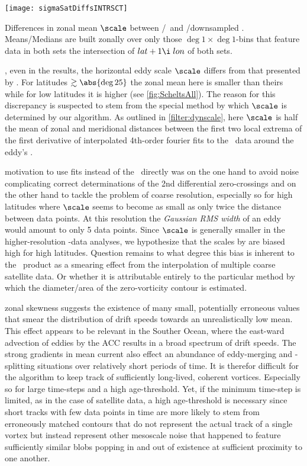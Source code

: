 \begin{marginfigure}
	\texttt{[image: sigmaSatDiffsINTRSCT]}
	\caption{Differences in zonal mean $\scale$ between \AVI/\POP~and \AVI/downsampled \POP. Means/Medians are built zonally over only those $\deg{1}\times\deg{1}$-bins that feature data in both sets \ie the intersection of $lat+1\i \; lon$ of both sets. }
	\label{fig:sigmaSatDiffsINTRSCT}
\end{marginfigure}

, even in the \aviI results, the horizontal eddy scale $\scale$ differs from that presented by \citet{Chelton2011}. For latitudes $\gtrsim\abs{\deg{25}}$ the zonal mean here is smaller than theirs while for low latitudes it is higher (see \cref{fig:ScheltsAll}). The reason for this discrepancy is suspected to stem from the special method by which $\scale$ is determined by our algorithm.
As outlined in \cref{filter:dynscale}, here $\scale$ is half the mean of zonal and meridional distances between the first two local extrema of the first derivative of interpolated 4th-order fourier fits to the \SSH~data around the eddy's \CoV.

 motivation to use fits instead of the \SSH~directly was on the one hand to avoid noise complicating correct determinations of the 2nd differential zero-crossings and on the other hand to tackle the problem of coarse resolution, especially so for high latitudes where $\scale$ seems to become as small as only twice the distance between data points. At this resolution the \textit{Gaussian RMS width} of an eddy would amount to only 5 data points. Since $\scale$ is generally smaller in the higher-resolution \POP-data analyses, we hypothesize that the scales by \citeauthor{Chelton2011} are biased high for high latitudes. Question remains to what degree this bias is inherent to the \AVI~product \ie as a smearing effect from the interpolation of multiple coarse satellite data. Or whether it is attributable entirely to the particular method by which the diameter/area of the zero-vorticity contour is estimated.

 zonal skewness suggests the existence of many small, potentially erroneous values that smear the distribution of drift speeds towards an unrealistically low mean. This effect appears to be relevant in \eg the Souther Ocean, where the east-ward advection of eddies by the ACC results in a broad spectrum of drift speeds.
The strong gradients in mean current also effect an abundance of eddy-merging and -splitting situations over relatively short periods of time. It is therefor difficult for the algorithm to keep track of sufficiently long-lived, coherent vortices. Especially so for large time-steps and a high age-threshold. Yet, if the minimum time-step is limited, as in the case of satellite data, a high age-threshold is necessary since short tracks with few data points in time are more likely to stem from erroneously matched contours that do not represent the actual track of a single vortex but instead represent other mesoscale noise that happened to feature sufficiently similar blobs popping in and out of existence at sufficient proximity to one another.

